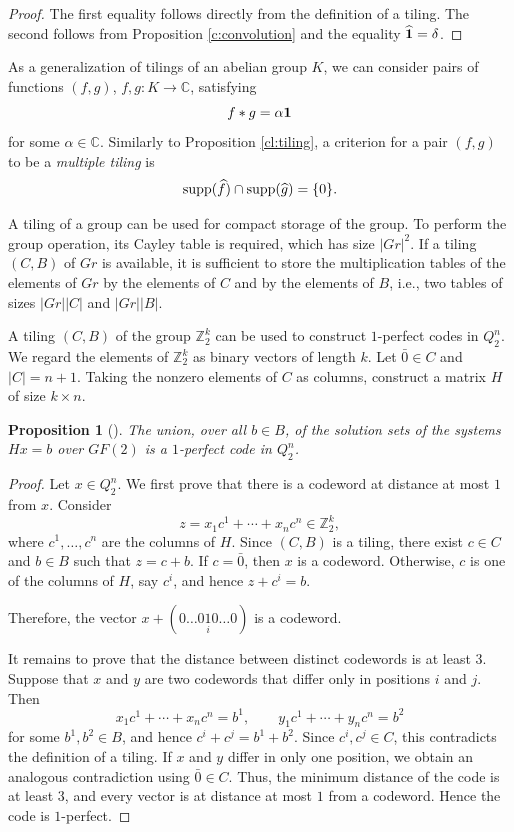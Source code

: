 \documentclass[11pt]{article}
\newtheorem{claim}{Proposition}[section]
\theoremstyle{definition}
\newcommand{\supp}{{\rm supp}}
\begin{document}
{{{\begin{proof}
The first equality follows directly from the definition of a tiling.
The second follows from Proposition \ref{c:convolution} and the
equality
$\widehat{\bf 1}=\delta$.
\end{proof}

As a generalization of tilings of an abelian group $K$, we can consider
pairs of functions $(f,g)$, $f,g:K\rightarrow\mathbb C$, satisfying
\[
f*g=\alpha{\bf 1}
\]
for some $\alpha\in\mathbb C$. Similarly to Proposition \ref{cl:tiling}, a
criterion for a pair $(f,g)$ to be a {\sl multiple tiling} is
\[
\supp(\widehat f)\cap\supp(\widehat g)=\{0\}.
\]

A tiling of a group can be used for compact storage of the group.
To perform the group operation, its Cayley table is required, which
has size $|Gr|^2$. If a tiling $(C,B)$ of $Gr$ is available, it is
sufficient to store the multiplication tables of the elements of $Gr$
by the elements of $C$ and by the elements of $B$, i.e., two tables
of sizes $|Gr||C|$ and $|Gr||B|$.

A tiling $(C,B)$ of the group $\mathbb Z_2^k$ can be used to construct
$1$-perfect codes in $Q_2^n$. We regard the elements of $\mathbb Z_2^k$
as binary vectors of length $k$. Let $\bar 0\in C$ and $|C|=n+1$.
Taking the nonzero elements of $C$ as columns, construct a matrix $H$
of size $k\times n$.

\begin{claim}[\cite{Cohen}]
The union, over all $b\in B$, of the solution sets of the systems
$
Hx=b
$
over $GF(2)$ is a $1$-perfect code in $Q_2^n$.
\end{claim}

\begin{proof}
Let $x\in Q_2^n$. We first prove that there is a codeword at distance
at most $1$ from $x$. Consider
\[
z=x_1c^1+\cdots+x_nc^n\in\mathbb Z_2^k,
\]
where $c^1,\ldots,c^n$ are the columns of $H$. Since $(C,B)$ is a
tiling, there exist $c\in C$ and $b\in B$ such that
$z=c+b$.
If $c=\bar0$, then $x$ is a codeword. Otherwise, $c$ is one of the
columns of $H$, say $c^i$, and hence
$
z+c^i=b$.

Therefore, the vector
$
x+(0\ldots0\underset{i}{1}0\ldots0)
$
is a codeword.

It remains to prove that the distance between distinct codewords is
at least $3$. Suppose that $x$ and $y$ are two codewords that differ
only in positions $i$ and $j$. Then
\[
x_1c^1+\cdots+x_nc^n=b^1,\qquad
y_1c^1+\cdots+y_nc^n=b^2
\]
for some $b^1,b^2\in B$, and hence
$
c^i+c^j=b^1+b^2$.
Since $c^i,c^j\in C$, this contradicts the definition of a tiling.
If $x$ and $y$ differ in only one position, we obtain an analogous
contradiction using $\bar0\in C$.
Thus, the minimum distance of the code is at least $3$, and every
vector is at distance at most $1$ from a codeword. Hence the code is
$1$-perfect.
\end{proof}

}}}
\end{document}
